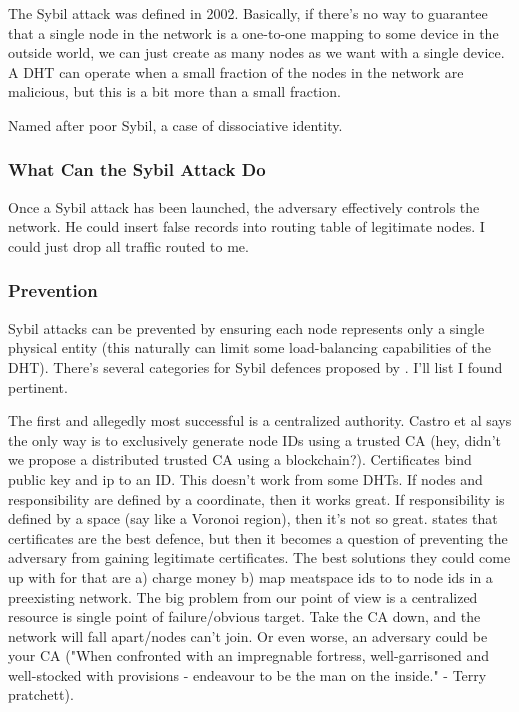 \documentclass[10pt,letterpaper]{report}
\begin{document}
The Sybil attack was defined in 2002.  Basically,  if there's no way to guarantee that a single node in the network is a one-to-one mapping to some device in the outside world, we can just create as many nodes as we want with a single device.  A DHT can operate when a small fraction of the nodes in the network are malicious, but this is a bit more than a small fraction.  

Named after poor Sybil, a case of dissociative identity.

\subsubsection{What Can the Sybil Attack Do}
Once a Sybil attack has been launched,  the adversary effectively controls the network.   He could insert false records into routing table of legitimate nodes.  I could just drop all traffic routed to me.

\subsubsection{Prevention}


Sybil attacks can be prevented by ensuring each node represents only a single physical entity (this naturally can limit some load-balancing capabilities of the DHT). There's several categories for Sybil defences proposed by \cite{dhtsec}.  I'll list I found pertinent.

The first and allegedly most successful is a centralized authority.  Castro et al says the only way is to exclusively generate node IDs using a trusted CA (hey, didn't we propose a distributed trusted CA using a blockchain?).   Certificates bind public key and ip to an ID. This doesn't work from some DHTs.  If nodes and responsibility are defined by a coordinate, then it works great.  If responsibility is defined by a space (say like a Voronoi region), then it's not so great.  \cite{dhtsec} states that certificates are the best defence, but then it becomes a question of preventing the adversary from gaining legitimate certificates.  The best solutions they could come up with for that are a) charge money b) map meatspace ids to to node ids in a preexisting network.  The big problem from our point of view is a centralized resource is single point of failure/obvious target.   Take the CA down, and the network will fall apart/nodes can't join.  Or even worse, an adversary could be your CA ("When confronted with an impregnable fortress, well-garrisoned and well-stocked with provisions - endeavour to be the man on the inside." - Terry pratchett).
\end{document}

